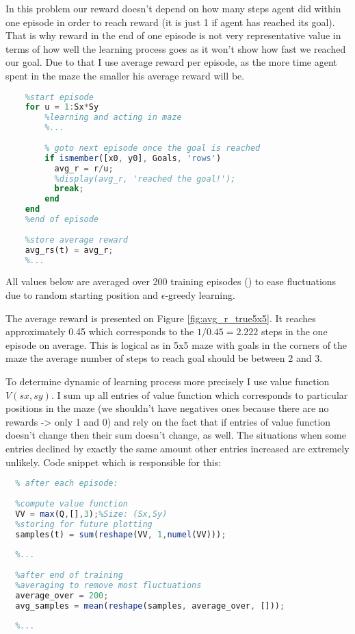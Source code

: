 \documentclass[a4paper,11pt]{article}
\theoremstyle{mytheor}
\begin{document}
In this problem our reward doesn't depend on how many steps agent did within one episode in order to reach reward (it is just 1 if agent has reached its goal). That is why reward in the end of one episode is not very representative value in terms of how well the learning process goes as it won't show how fast we reached our goal. Due to that I use average reward per episode, as the more time agent spent in the maze the smaller his average reward will be.

\begin{lstlisting}[language=Octave]
    %...
    %start episode
    for u = 1:Sx*Sy
        %learning and acting in maze
        %...
    
        % goto next episode once the goal is reached
        if ismember([x0, y0], Goals, 'rows') 
          avg_r = r/u;
          %display(avg_r, 'reached the goal!');
          break; 
        end
    end
    %end of episode
    
    %store average reward
    avg_rs(t) = avg_r;
    %...
\end{lstlisting}

All values below are averaged over 200 training episodes () to ease fluctuations due to random starting position and $\epsilon$-greedy learning.

The average reward is presented on Figure \ref{fig:avg_r_true5x5}. It reaches approximately 0.45 which corresponds to the $1/0.45=2.222$ steps in the one episode on average. This is logical as in 5x5 maze with goals in the corners of the maze the average number of steps to reach goal should be between 2 and 3. 

To determine dynamic of learning process more precisely I use value function $V(sx, sy)$. I sum up all entries of value function which corresponds to particular positions in the maze  (we shouldn't have negatives ones because there are no rewards -> only 1 and 0) and rely on the fact that if entries of value function doesn't change then their sum doesn't change, as well. The situations when some entries declined by exactly the same amount other entries increased are extremely unlikely. 
Code snippet which is responsible for this:
\begin{lstlisting}[language=Octave]
  %...    
  % after each episode:
  
  %compute value function 
  VV = max(Q,[],3);%Size: (Sx,Sy)
  %storing for future plotting
  samples(t) = sum(reshape(VV, 1,numel(VV)));
  
  %...
  
  %after end of training
  %averaging to remove most fluctuations
  average_over = 200;
  avg_samples = mean(reshape(samples, average_over, []));
  
  %...
\end{lstlisting}
\end{document}
